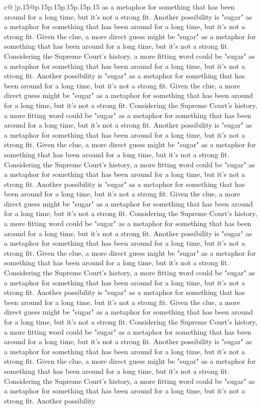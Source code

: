 \documentclass{article}
\begin{document}
{\begin{supertabular}{c@{$\;$}|p{.15\linewidth}@{}p{.15\linewidth}p{.15\linewidth}p{.15\linewidth}p{.15\linewidth}p{.15\linewidth}}
{{{as a metaphor for something that has been around for a long time, but it's not a strong fit. Another possibility is "sugar" as a metaphor for something that has been around for a long time, but it's not a strong fit. Given the clue, a more direct guess might be "sugar" as a metaphor for something that has been around for a long time, but it's not a strong fit. Considering the Supreme Court's history, a more fitting word could be "sugar" as a metaphor for something that has been around for a long time, but it's not a strong fit. Another possibility is "sugar" as a metaphor for something that has been around for a long time, but it's not a strong fit. Given the clue, a more direct guess might be "sugar" as a metaphor for something that has been around for a long time, but it's not a strong fit. Considering the Supreme Court's history, a more fitting word could be "sugar" as a metaphor for something that has been around for a long time, but it's not a strong fit. Another possibility is "sugar" as a metaphor for something that has been around for a long time, but it's not a strong fit. Given the clue, a more direct guess might be "sugar" as a metaphor for something that has been around for a long time, but it's not a strong fit. Considering the Supreme Court's history, a more fitting word could be "sugar" as a metaphor for something that has been around for a long time, but it's not a strong fit. Another possibility is "sugar" as a metaphor for something that has been around for a long time, but it's not a strong fit. Given the clue, a more direct guess might be "sugar" as a metaphor for something that has been around for a long time, but it's not a strong fit. Considering the Supreme Court's history, a more fitting word could be "sugar" as a metaphor for something that has been around for a long time, but it's not a strong fit. Another possibility is "sugar" as a metaphor for something that has been around for a long time, but it's not a strong fit. Given the clue, a more direct guess might be "sugar" as a metaphor for something that has been around for a long time, but it's not a strong fit. Considering the Supreme Court's history, a more fitting word could be "sugar" as a metaphor for something that has been around for a long time, but it's not a strong fit. Another possibility is "sugar" as a metaphor for something that has been around for a long time, but it's not a strong fit. Given the clue, a more direct guess might be "sugar" as a metaphor for something that has been around for a long time, but it's not a strong fit. Considering the Supreme Court's history, a more fitting word could be "sugar" as a metaphor for something that has been around for a long time, but it's not a strong fit. Another possibility is "sugar" as a metaphor for something that has been around for a long time, but it's not a strong fit. Given the clue, a more direct guess might be "sugar" as a metaphor for something that has been around for a long time, but it's not a strong fit. Considering the Supreme Court's history, a more fitting word could be "sugar" as a metaphor for something that has been around for a long time, but it's not a strong fit. Another possibility }}}
\end{supertabular}}
\end{document}

